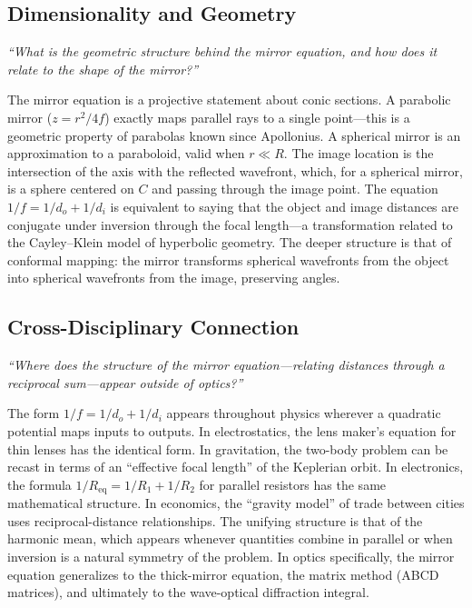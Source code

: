 \subsection*{Dimensionality and Geometry}
\textit{``What is the geometric structure behind the mirror equation, and how does it relate to the shape of the mirror?''}

The mirror equation is a projective statement about conic sections. A parabolic mirror ($z = r^{2}/4f$) exactly maps parallel rays to a single point---this is a geometric property of parabolas known since Apollonius. A spherical mirror is an approximation to a paraboloid, valid when $r \ll R$. The image location is the intersection of the axis with the reflected wavefront, which, for a spherical mirror, is a sphere centered on $C$ and passing through the image point. The equation $1/f = 1/d_{o} + 1/d_{i}$ is equivalent to saying that the object and image distances are conjugate under inversion through the focal length---a transformation related to the Cayley--Klein model of hyperbolic geometry. The deeper structure is that of conformal mapping: the mirror transforms spherical wavefronts from the object into spherical wavefronts from the image, preserving angles.

\subsection*{Cross-Disciplinary Connection}
\textit{``Where does the structure of the mirror equation---relating distances through a reciprocal sum---appear outside of optics?''}

The form $1/f = 1/d_{o} + 1/d_{i}$ appears throughout physics wherever a quadratic potential maps inputs to outputs. In electrostatics, the lens maker's equation for thin lenses has the identical form. In gravitation, the two-body problem can be recast in terms of an ``effective focal length'' of the Keplerian orbit. In electronics, the formula $1/R_{\text{eq}} = 1/R_{1} + 1/R_{2}$ for parallel resistors has the same mathematical structure. In economics, the ``gravity model'' of trade between cities uses reciprocal-distance relationships. The unifying structure is that of the harmonic mean, which appears whenever quantities combine in parallel or when inversion is a natural symmetry of the problem. In optics specifically, the mirror equation generalizes to the thick-mirror equation, the matrix method (ABCD matrices), and ultimately to the wave-optical diffraction integral.

